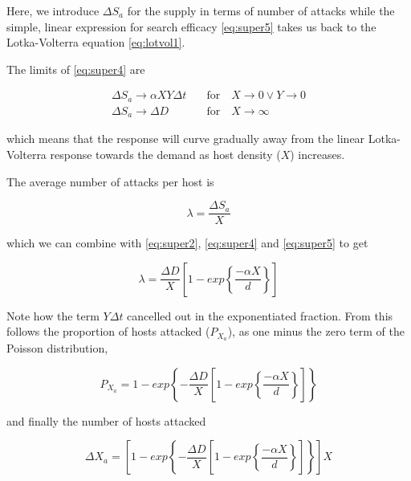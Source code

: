 Here, we introduce $\Delta S_a$ for the supply in terms of number of attacks while the simple, linear expression for search efficacy \eqref{eq:super5} takes us back to the Lotka-Volterra equation \eqref{eq:lotvol1}. 

The limits of \eqref{eq:super4} are

\begin{equation}
  \begin{aligned}
    \Delta S_a \rightarrow \alpha XY \Delta t\quad &\text{for}\quad X\rightarrow 0 \lor Y\rightarrow 0 \\
    \Delta S_a \rightarrow \Delta D\quad           &\text{for}\quad X\rightarrow \infty
  \end{aligned} \label{eq:limsa}
\end{equation}

\noindent which means that the response will curve gradually away from the linear Lotka-Volterra response towards the demand as host density ($X$) increases.

The average number of attacks per host is 

\begin{equation}
  \lambda = \frac{\Delta S_a}{X} 
\end{equation}

\noindent which we can combine with \eqref{eq:super2}, \eqref{eq:super4} and \eqref{eq:super5} to get

\begin{equation}
  \lambda = \frac{\Delta D}{X} \left[1-exp\left\{\frac{-\alpha X}{d}\right\}\right] 
\end{equation}

Note how the term $Y \Delta t$ cancelled out in the exponentiated fraction. From this follows the proportion of hosts attacked ($P_{X_a}$), as one minus the zero term of the Poisson distribution,

\begin{equation}
  P_{X_a} = 1 - exp \left\{-\frac{\Delta D}{X} \left[1-exp\left\{\frac{-\alpha X}{d}\right\}\right] \right\}
\end{equation}

\noindent and finally the number of hosts attacked

\begin{equation}
  \Delta X_a = \left[ 1 - exp \left\{-\frac{\Delta D}{X} \left[1-exp\left\{\frac{-\alpha X}{d}\right\}\right] \right\} \right] X \label{eq:frazer-gilbert}
\end{equation}

